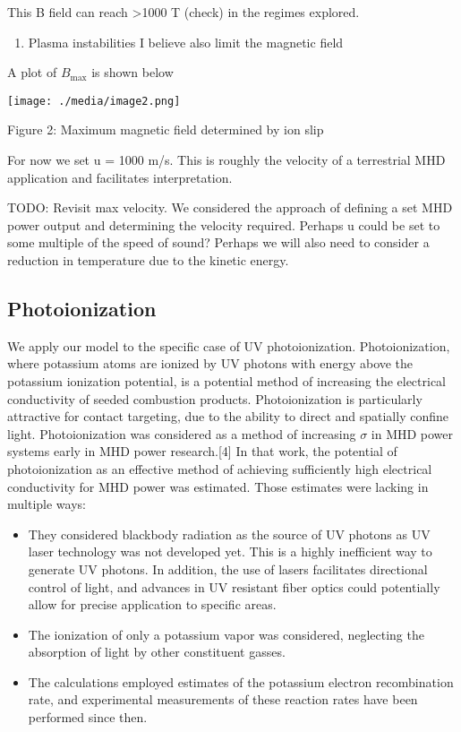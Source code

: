 This B field can reach \textgreater1000 T (check) in the regimes explored.

\begin{enumerate}
\def\labelenumi{\alph{enumi}.}
\item
  Plasma instabilities I believe also limit the magnetic field
\end{enumerate}

A plot of \(B_{\max}\) is shown below

\texttt{[image: ./media/image2.png]}

Figure 2: Maximum magnetic field determined by ion slip

For now we set u = 1000 m/s. This is roughly the velocity of a terrestrial MHD application and facilitates interpretation.

TODO: Revisit max velocity. We considered the approach of defining a set MHD power output and determining the velocity required. Perhaps u could be set to some multiple of the speed of sound? Perhaps we will also need to consider a reduction in temperature due to the kinetic energy.

\hypertarget{photoionization}{%
\subsection{Photoionization}\label{photoionization}}

We apply our model to the specific case of UV photoionization. Photoionization, where potassium atoms are ionized by UV photons with energy above the potassium ionization potential, is a potential method of increasing the electrical conductivity of seeded combustion products. Photoionization is particularly attractive for contact targeting, due to the ability to direct and spatially confine light. Photoionization was considered as a method of increasing \(\sigma\) in MHD power systems early in MHD power research.{[}4{]} In that work, the potential of photoionization as an effective method of achieving sufficiently high electrical conductivity for MHD power was estimated. Those estimates were lacking in multiple ways:

\begin{itemize}
\item
  They considered blackbody radiation as the source of UV photons as UV laser technology was not developed yet. This is a highly inefficient way to generate UV photons. In addition, the use of lasers facilitates directional control of light, and advances in UV resistant fiber optics could potentially allow for precise application to specific areas.
\item
  The ionization of only a potassium vapor was considered, neglecting the absorption of light by other constituent gasses.
\item
  The calculations employed estimates of the potassium electron recombination rate, and experimental measurements of these reaction rates have been performed since then.
\end{itemize}

